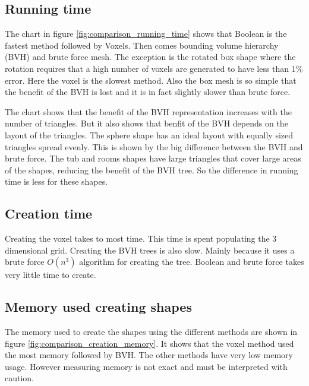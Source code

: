 \documentclass[11pt,twoside,a4paper]{report}
\begin{document}
\subsection{Running time}
The chart in figure \ref{fig:comparison_running_time} shows that Boolean is the fastest method followed by Voxels. Then comes bounding volume hierarchy (BVH) and brute force mesh. The exception is the rotated box shape where the rotation requires that a high number of voxels are generated to have less than 1\% error. Here the voxel is the slowest method. Also the box mesh is so simple that the benefit of the BVH is lost and it is in fact slightly slower than brute force.

The chart shows that the benefit of the BVH representation increases with the number of triangles. But it also shows that benfit of the BVH depends on the layout of the triangles. The sphere shape has an ideal layout with equally sized triangles spread evenly. This is shown by the big difference between the BVH and brute force. The tub and rooms shapes have large triangles that cover large areas of the shapes, reducing the benefit of the BVH tree. So the difference in running time is less for these shapes.

\subsection{Creation time}
Creating the voxel takes to most time. This time is spent populating the 3 dimensional grid. Creating the BVH trees is also slow. Mainly because it uses a brute force $O(n^3)$ algorithm for creating the tree. Boolean and brute force takes very little time to create.

\subsection{Memory used creating shapes}
The memory used to create the shapes using the different methods are shown in figure \ref{fig:comparison_creation_memory}. It shows that the voxel method used the most memory followed by BVH. The other methods have very low memory usage. However measuring memory is not exact and must be interpreted with caution. 
\end{document}

